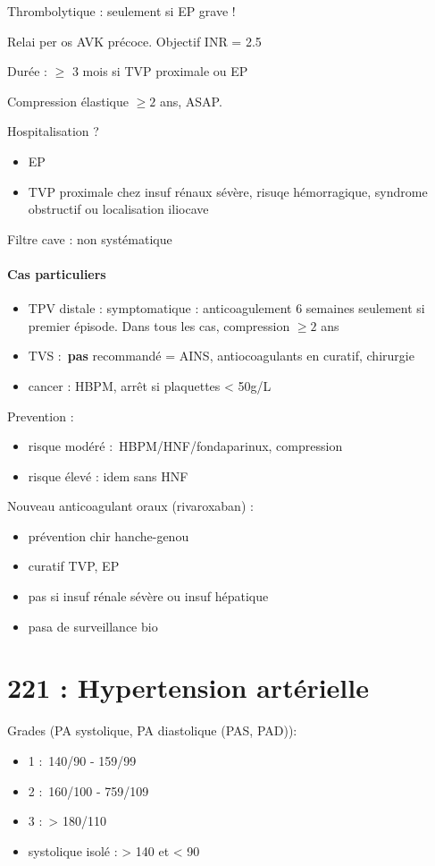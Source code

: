 \documentclass{article}
\begin{document}
Thrombolytique : seulement si EP grave !

Relai per os AVK précoce. Objectif INR = 2.5

Durée : $\ge$ 3 mois si TVP proximale ou EP

Compression élastique $\ge 2$ ans, ASAP. 

Hospitalisation ? 
\begin{itemize}
  \item EP
  \item TVP proximale chez insuf rénaux sévère, risuqe hémorragique, syndrome
    obstructif ou localisation iliocave
\end{itemize}

Filtre cave : non systématique

\paragraph{Cas particuliers}
\begin{itemize}
  \item 
TPV distale : symptomatique : anticoagulement 6 semaines seulement si premier épisode. Dans tous les cas,
compression $\ge 2$ ans
\item TVS : \textbf{pas} recommandé = AINS, antiocoagulants en curatif, chirurgie
\item cancer : HBPM, arrêt si plaquettes < 50g/L
\end{itemize}
Prevention : 
\begin{itemize}
  \item risque modéré : HBPM/HNF/fondaparinux, compression
  \item risque élevé : idem sans HNF
\end{itemize}

Nouveau anticoagulant oraux (rivaroxaban) :
\begin{itemize}
  \item prévention chir hanche-genou
  \item curatif TVP, EP
  \item pas si insuf rénale sévère ou insuf hépatique
  \item pasa de surveillance bio
\end{itemize}

\section{221 : Hypertension artérielle}%
\label{sec:221_hypertension_arterielle}
Grades (PA systolique, PA diastolique (PAS, PAD)):
\begin{itemize}
  \item 1 : 140/90 - 159/99
  \item 2 : 160/100 - 759/109
  \item 3 : > 180/110
  \item systolique isolé : > 140 et < 90
\end{itemize}
\end{document}
